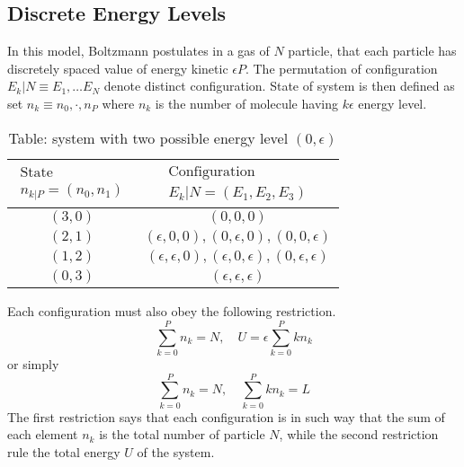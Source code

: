 \documentclass[../../../Main.tex]{subfiles}
\begin{document}
\subsection*{Discrete Energy Levels}
In this model, Boltzmann postulates in a gas of $N$ particle, that each particle has discretely spaced value of energy kinetic $\epsilon P$. The permutation of configuration $E_k|N\equiv E_1,\dots E_N$ denote distinct configuration. State of system is then defined as set $n_k\equiv n_0,\cdot, n_P$ where $n_k$ is the number of molecule having $k\epsilon$ energy level.

\begin{table*}[ht]
    \begin{center}
\caption*{Table: system with two possible energy level $(0, \epsilon)$}
\begin{tabular}{c || c}
    \hline\hline
    $\begin{array}{c}\text{State} \\n_{k|P}=(n_0,n_1)\end{array}$  &  $\begin{array}{c}\text{Configuration} \\ E_k|N=(E_1 , E_2 , E_3 )\end{array}$ \\
    \hline\hline
    $(3, 0)$&$(0, 0, 0)$\\
    $(2, 1)$&$(\epsilon, 0, 0), (0, \epsilon, 0), (0, 0, \epsilon)$\\
    $(1, 2)$&$(\epsilon, \epsilon, 0), (\epsilon, 0, \epsilon), (0, \epsilon, \epsilon)$\\
    $(0, 3)$&$(\epsilon, \epsilon, \epsilon)$\\
\end{tabular}
    \end{center}
\end{table*}

Each configuration must also obey the following restriction.
\begin{equation*}
    \sum_{k=0}^{P}n_k=N,\quad U=\epsilon\sum_{k=0}^{P} kn_k
\end{equation*}
or simply
\begin{equation*}
    \sum_{k=0}^{P}n_k=N,\quad \sum_{k=0}^{P} kn_k=L
\end{equation*}
The first restriction says that each configuration is in such way that the sum of each element $n_k$ is the total number of particle $N$, while the second restriction rule the total energy $U$ of the system.
\end{document}
